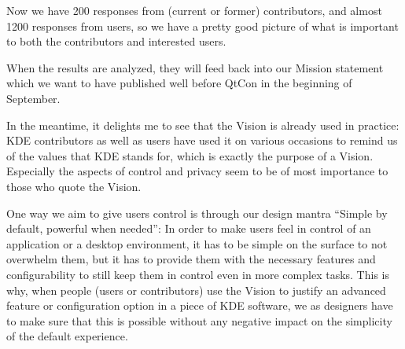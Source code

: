 Now we have 200 responses from (current or former) contributors, and almost 1200 responses from users, so we have a pretty good picture of what is important to both the contributors and interested users.

When the results are analyzed, they will feed back into our Mission statement which we want to have published well before QtCon in the beginning of September.

In the meantime, it delights me to see that the Vision is already used in practice: KDE contributors as well as users have used it on various occasions to remind us of the values that KDE stands for, which is exactly the purpose of a Vision. Especially the aspects of control and privacy seem to be of most importance to those who quote the Vision. 

One way we aim to give users control is through our design mantra ``Simple by default, powerful when needed'': In order to make users feel in control of an application or a desktop environment, it has to be simple on the surface to not overwhelm them, but it has to provide them with the necessary features and configurability to still keep them in control even in more complex tasks. This is why, when people (users or contributors) use the Vision to justify an advanced feature or configuration option in a piece of KDE software, we as designers have to make sure that this is possible without any negative impact on the simplicity of the default experience.

